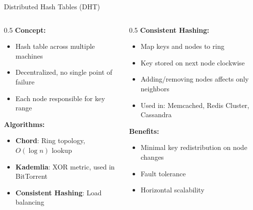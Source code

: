 \documentclass[aspectratio=169,xcolor=dvipsnames]{beamer}
\begin{document}
\begin{frame}{Distributed Hash Tables (DHT)}
  \begin{columns}
    \begin{column}{0.5\textwidth}
      \textbf{Concept:}
      \begin{itemize}
        \item Hash table across multiple machines
        \item Decentralized, no single point of failure
        \item Each node responsible for key range
      \end{itemize}

      \vspace{0.3cm}
      \textbf{Algorithms:}
      \begin{itemize}
        \item \textbf{Chord}: Ring topology, $O(\log n)$ lookup
        \item \textbf{Kademlia}: XOR metric, used in BitTorrent
        \item \textbf{Consistent Hashing}: Load balancing
      \end{itemize}
    \end{column}

    \begin{column}{0.5\textwidth}
      \textbf{Consistent Hashing:}
      \begin{itemize}
        \item Map keys and nodes to ring
        \item Key stored on next node clockwise
        \item Adding/removing nodes affects only neighbors
        \item Used in: Memcached, Redis Cluster, Cassandra
      \end{itemize}

      \vspace{0.3cm}
      \textbf{Benefits:}
      \begin{itemize}
        \item Minimal key redistribution on node changes
        \item Fault tolerance
        \item Horizontal scalability
      \end{itemize}
    \end{column}
  \end{columns}
\end{frame}
\end{document}
